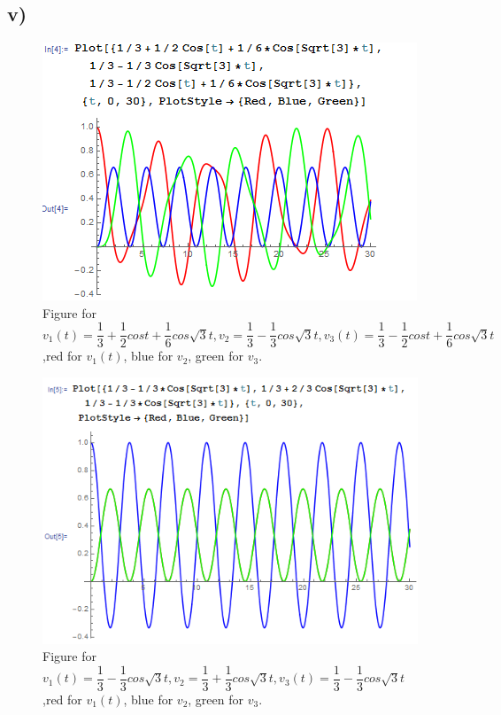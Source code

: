\documentclass[a4paper,12pt,titlepage]{article}
\begin{document}
\subsection*{v)}
\begin{figure}[H]
    \centering
    \includegraphics[width=11
    cm]{51.png}
    \caption{Figure for $v_1(t)=\dfrac{1}{3}+\dfrac{1}{2}cost+\dfrac{1}{6}cos\sqrt{3}t,v_2=\dfrac{1}{3}-\dfrac{1}{3}cos\sqrt{3}t,v_3(t)=\dfrac{1}{3}-\dfrac{1}{2}cost+\dfrac{1}{6}cos\sqrt{3}t$,red for $v_1(t)$, blue for $v_2$, green for $v_3$.}
\end{figure}

\begin{figure}[H]
    \centering
    \includegraphics[width=11
    cm]{52.png}
    \caption{Figure for $v_1(t)=\dfrac{1}{3}-\dfrac{1}{3}cos\sqrt{3}t,v_2=\dfrac{1}{3}+\dfrac{1}{3}cos\sqrt{3}t,v_3(t)=\dfrac{1}{3}-\dfrac{1}{3}cos\sqrt{3}t$,red for $v_1(t)$, blue for $v_2$, green for $v_3$.}
\end{figure}
\end{document}
